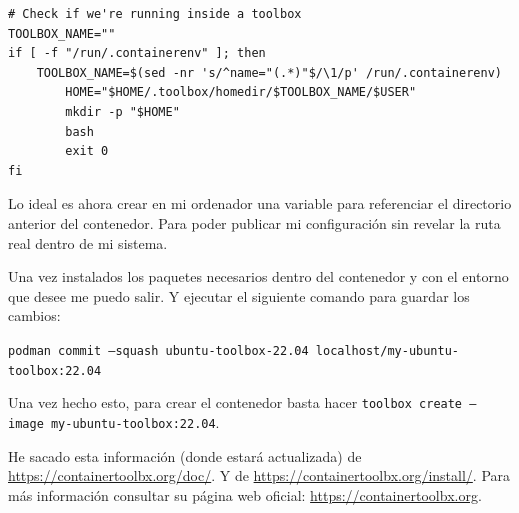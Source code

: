 \documentclass{article}
\begin{document}
    \begin{verbatim}
# Check if we're running inside a toolbox
TOOLBOX_NAME=""
if [ -f "/run/.containerenv" ]; then
	TOOLBOX_NAME=$(sed -nr 's/^name="(.*)"$/\1/p' /run/.containerenv)
        HOME="$HOME/.toolbox/homedir/$TOOLBOX_NAME/$USER"
        mkdir -p "$HOME"
        bash
        exit 0
fi
    \end{verbatim}

    Lo ideal es ahora crear en mi ordenador una variable para referenciar el
    directorio anterior del contenedor. Para poder publicar mi configuración
    sin revelar la ruta real dentro de mi sistema.
    
    Una vez instalados los paquetes necesarios dentro del contenedor y con
    el entorno que desee me puedo salir. Y ejecutar el siguiente comando
    para guardar los cambios:

    \texttt{podman commit --squash ubuntu-toolbox-22.04 localhost/my-ubuntu-toolbox:22.04}

    Una vez hecho esto, para crear el contenedor basta hacer
    \texttt{toolbox create --image my-ubuntu-toolbox:22.04}.
    
    He sacado esta información (donde estará actualizada) de
    \href{https://containertoolbx.org/doc/}{https://containertoolbx.org/doc/}.
    Y de \href{https://containertoolbx.org/install/}
    {https://containertoolbx.org/install/}. Para más información consultar su
    página web oficial: \href{https://containertoolbx.org}
    {https://containertoolbx.org}.
\end{document}
